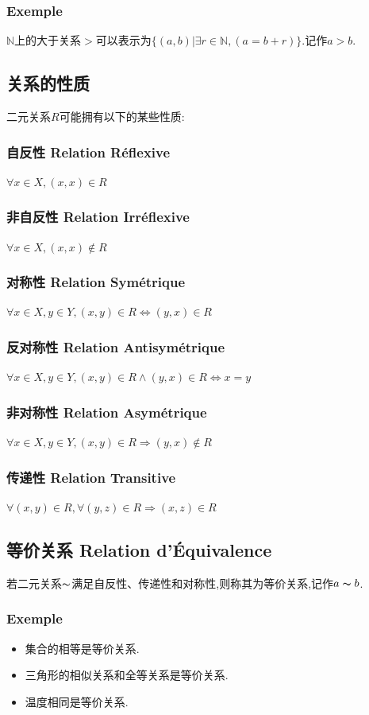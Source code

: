 \documentclass[12pt, a4paper, oneside]{ctexbook}
\begin{document}
  \subsubsection{Exemple}
  $\mathbb{N}$上的大于关系$>$可以表示为$\{(a,b)|\exists r\in \mathbb{N},(a=b+r)\}$.记作$a>b$.
  \subsection{关系的性质}
  二元关系$R$可能拥有以下的某些性质:
  \subsubsection{自反性 Relation Réflexive}
  $\forall x\in X,(x,x)\in R$
  \subsubsection{非自反性 Relation Irréflexive}
  $\forall x\in X,(x,x)\notin R$
  \subsubsection{对称性 Relation Symétrique}
  $\forall x\in X,y\in Y,(x,y)\in R\Leftrightarrow(y,x)\in R$
  \subsubsection{反对称性 Relation Antisymétrique}
  $\forall x\in X,y\in Y,(x,y)\in R\land(y,x)\in R \Leftrightarrow x= y$
  \subsubsection{非对称性 Relation Asymétrique}
  $\forall x\in X,y\in Y,(x,y)\in R\Rightarrow (y,x)\notin R$
  \subsubsection{传递性  Relation Transitive}
  $\forall(x,y)\in R,\forall (y,z)\in R\Rightarrow(x,z)\in R$
  \subsection{等价关系 Relation d'Équivalence}
  若二元关系$\thicksim $满足自反性、传递性和对称性,则称其为等价关系,记作$a\thicksim b$.
  \subsubsection{Exemple}
  \begin{itemize}
    \item 集合的相等是等价关系.
    \item 三角形的相似关系和全等关系是等价关系.
    \item 温度相同是等价关系.
  \end{itemize}
\end{document}
